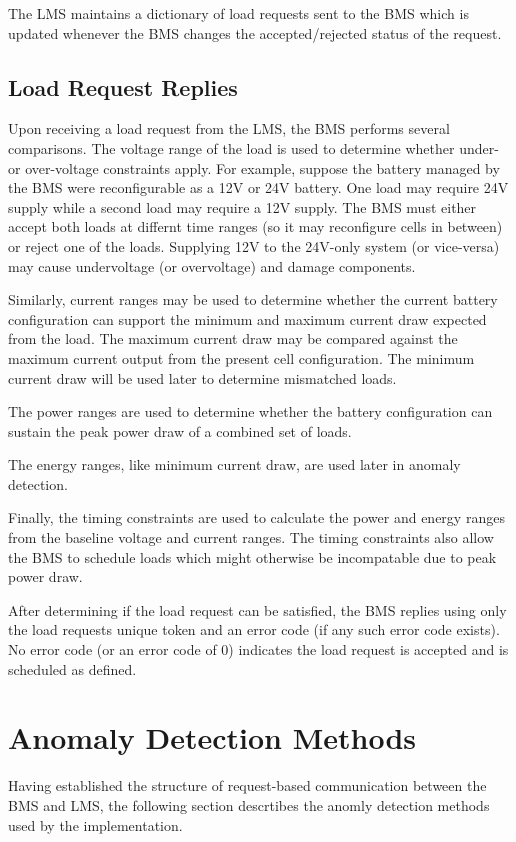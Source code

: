 \documentclass[11pt,conference,draftcls,onecolumn]{IEEEtran}
\begin{document}
The LMS maintains a dictionary of load requests sent to the BMS which is updated whenever the BMS changes the accepted/rejected status of the request. 

\subsection{Load Request Replies}
Upon receiving a load request from the LMS, the BMS performs several comparisons.
The voltage range of the load is used to determine whether under- or over-voltage constraints apply.
For example, suppose the battery managed by the BMS were reconfigurable as a 12V or 24V battery. One load may require 24V supply while a second load may require a 12V supply. The BMS must either accept both loads at differnt time ranges (so it may reconfigure cells in between) or reject one of the loads.
Supplying 12V to the 24V-only system (or vice-versa) may cause undervoltage (or overvoltage) and damage components.

Similarly, current ranges may be used to determine whether the current battery configuration can support the minimum and maximum current draw expected from the load.
The maximum current draw may be compared against the maximum current output from the present cell configuration.
The minimum current draw will be used later to determine mismatched loads.

The power ranges are used to determine whether the battery configuration can sustain the peak power draw of a combined set of loads.

The energy ranges, like minimum current draw, are used later in anomaly detection.

Finally, the timing constraints are used to calculate the power and energy ranges from the baseline voltage and current ranges.
The timing constraints also allow the BMS to schedule loads which might otherwise be incompatable due to peak power draw.

After determining if the load request can be satisfied, the BMS replies using only the load requests unique token and an error code (if any such error code exists).
No error code (or an error code of 0) indicates the load request is accepted and is scheduled as defined.

\section{Anomaly Detection Methods}\label{sec:anomalyDetection}
Having established the structure of request-based communication between the BMS and LMS, the following section descrtibes the anomly detection methods used by the implementation.
\end{document}
